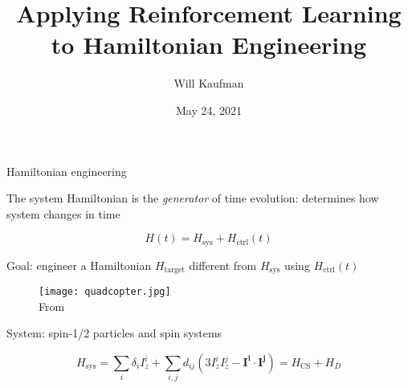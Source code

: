\documentclass{beamer}
\title[RL for Hamiltonian Engineering]{Applying Reinforcement Learning to Hamiltonian Engineering}
\author[Will Kaufman]{
Will Kaufman\inst{1}
}
\date[Spring 2021]{May 24, 2021 \\
}
\institute[Dartmouth College]{
\inst{1}Department of Physics and Astronomy, Dartmouth College \\
Hanover, NH 03755, USA
}
\begin{document}
\frame{\titlepage}




\begin{frame}{Hamiltonian engineering}


The system Hamiltonian is the \emph{generator} of time evolution: determines how system changes in time

\[
H(t) = H_{\text{sys}} + H_{\text{ctrl}}(t)
\]

Goal: engineer a Hamiltonian $H_{\text{target}}$ different from $H_{\text{sys}}$ using $H_{\text{ctrl}}(t)$

\begin{figure}
\centering
\texttt{[image: quadcopter.jpg]} \\
From \cite{quadcopter}
\end{figure}




\end{frame}



\begin{frame}{System: spin-1/2 particles and spin systems}

\begin{figure}
\centering
%     
    \centering
    \scalebox{.8}{
    
    }
\end{figure}

% 

\[
H_{\text{sys}} =\sum _{i}\delta_{i} I^{i}_{z}
    + \sum _{i,j}d_{ij}\left( 3I^{i}_{z} I^{j}_{z} -\mathbf{I^{i}} \cdot \mathbf{I^{j}}\right)
    = H_{\text{CS}} + H_{D}
\]



\end{frame}
\end{document}
